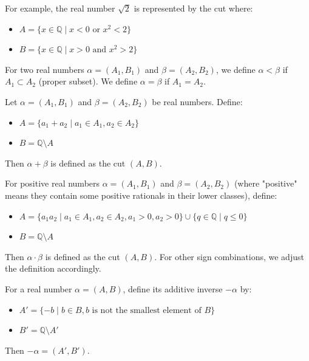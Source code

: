 For example, the real number $\sqrt{2}$ is represented by the cut where:
\begin{itemize}
    \item $A = \{x \in \mathbb{Q} \mid x < 0 \text{ or } x^2 < 2\}$
    \item $B = \{x \in \mathbb{Q} \mid x > 0 \text{ and } x^2 > 2\}$
\end{itemize}

\begin{definition}
For two real numbers $\alpha = (A_1, B_1)$ and $\beta = (A_2, B_2)$, we define $\alpha < \beta$ if $A_1 \subset A_2$ (proper subset). We define $\alpha = \beta$ if $A_1 = A_2$.
\end{definition}

\begin{definition}
Let $\alpha = (A_1, B_1)$ and $\beta = (A_2, B_2)$ be real numbers. Define:
\begin{itemize}
    \item $A = \{a_1 + a_2 \mid a_1 \in A_1, a_2 \in A_2\}$
    \item $B = \mathbb{Q} \setminus A$
\end{itemize}
Then $\alpha + \beta$ is defined as the cut $(A, B)$.
\end{definition}

\begin{definition}
For positive real numbers $\alpha = (A_1, B_1)$ and $\beta = (A_2, B_2)$ (where "positive" means they contain some positive rationals in their lower classes), define:
\begin{itemize}
    \item $A = \{a_1a_2 \mid a_1 \in A_1, a_2 \in A_2, a_1 > 0, a_2 > 0\} \cup \{q \in \mathbb{Q} \mid q \le 0\}$
    \item $B = \mathbb{Q} \setminus A$
\end{itemize}
Then $\alpha \cdot \beta$ is defined as the cut $(A, B)$. For other sign combinations, we adjust the definition accordingly.
\end{definition}

\begin{definition}
For a real number $\alpha = (A, B)$, define its additive inverse $-\alpha$ by:
\begin{itemize}
    \item $A' = \{-b \mid b \in B, b \text{ is not the smallest element of } B\}$
    \item $B' = \mathbb{Q} \setminus A'$
\end{itemize}
Then $-\alpha = (A', B')$.
\end{definition}

